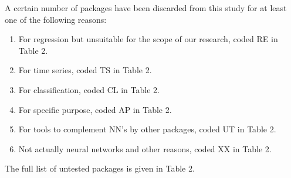 A certain number of packages have been discarded from this study for at
least one of the following reasons:

\begin{enumerate}
\def\labelenumi{\arabic{enumi}.}
\tightlist
\item
  For regression but unsuitable for the scope of our research, coded RE
  in Table 2.
\item
  For time series, coded TS in Table 2.
\item
  For classification, coded CL in Table 2.
\item
  For specific purpose, coded AP in Table 2.
\item
  For tools to complement NN's by other packages, coded UT in Table 2.
\item
  Not actually neural networks and other reasons, coded XX in Table 2.
\end{enumerate}

The full list of untested packages is given in Table 2.

